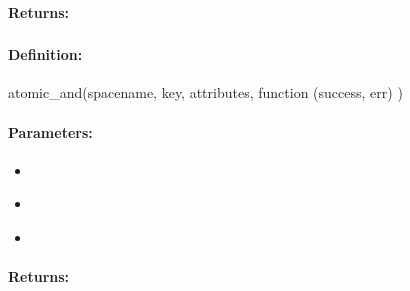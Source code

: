 \paragraph{Returns:}


\pagebreak
\subsubsection{}
\label{api:nodejs:atomic_and}


\paragraph{Definition:}
\begin{javascriptcode}
atomic_and(spacename, key, attributes, function (success, err) {})
\end{javascriptcode}
\paragraph{Parameters:}
\begin{itemize}[noitemsep]
\item {}\\

\item {}\\

\item {}\\

\end{itemize}

\paragraph{Returns:}


\pagebreak
\subsubsection{}
\label{api:nodejs:cond_atomic_and}


